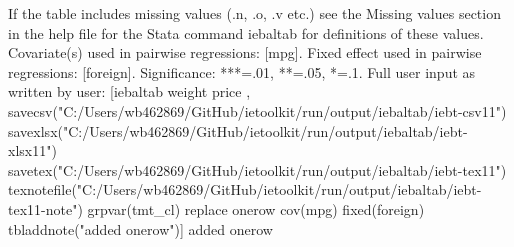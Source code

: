 If the table includes missing values (.n, .o, .v etc.) see the Missing values section in the help file for the Stata command iebaltab for definitions of these values. Covariate(s) used in pairwise regressions: [mpg]. Fixed effect used in pairwise regressions: [foreign]. Significance: ***=.01, **=.05, *=.1. Full user input as written by user: [iebaltab weight price , savecsv("C:/Users/wb462869/GitHub/ietoolkit/run/output/iebaltab/iebt-csv11") savexlsx("C:/Users/wb462869/GitHub/ietoolkit/run/output/iebaltab/iebt-xlsx11") savetex("C:/Users/wb462869/GitHub/ietoolkit/run/output/iebaltab/iebt-tex11") texnotefile("C:/Users/wb462869/GitHub/ietoolkit/run/output/iebaltab/iebt-tex11-note") grpvar(tmt\_cl) replace onerow cov(mpg) fixed(foreign) tbladdnote("added onerow")] added onerow
